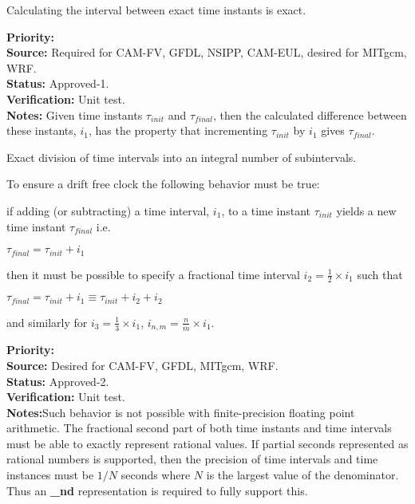 Calculating the interval between exact time instants is exact.
\begin{reqlist}
{\bf Priority:} \\
{\bf Source:} Required for CAM-FV, GFDL, NSIPP, CAM-EUL, desired for MITgcm, WRF. \\
{\bf Status:} Approved-1. \\
{\bf Verification:} Unit test. \\
{\bf Notes:} 
Given time instants $\tau_{init}$ and $\tau_{final}$, then the calculated
difference between these instants, $i_{1}$, has the property that 
incrementing $\tau_{init}$ by $i_{1}$ gives $\tau_{final}$.
\end{reqlist}

Exact division of time intervals into an integral number of subintervals.

To ensure a drift free clock the following behavior must be true:

if adding (or subtracting) a time interval, $i_{1}$, to a time 
instant $\tau_{init}$ yields a new time instant $\tau_{final}$ i.e.

$\tau_{final}=\tau_{init}+i_1 $

then it must be possible to specify a fractional time 
interval $i_{2} = \frac{1}{2}\times i_{1}$ such that

$\tau_{final}=\tau_{init}+i_1\equiv\tau_{init}+i_2+i_2 $

and similarly for $i_{3} = \frac{1}{3}\times i_{1}$, $i_{n,m} = \frac{n}{m}\times i_{1}$.
\begin{reqlist}
{\bf Priority:} \\
{\bf Source:} Desired for CAM-FV, GFDL, MITgcm, WRF. \\
{\bf Status:} Approved-2. \\
{\bf Verification:} Unit test. \\  
{\bf Notes:}Such behavior is not possible with finite-precision floating
point arithmetic.  The fractional second part of both time instants and
time intervals must be able to exactly represent rational values.  If
partial seconds represented as rational numbers is supported, then the
precision of time intervals and time instances must be $1/N$ seconds where
$N$ is the largest value of the denominator.  Thus an {\bf \_nd} representation
is required to fully support this.
\end{reqlist}

